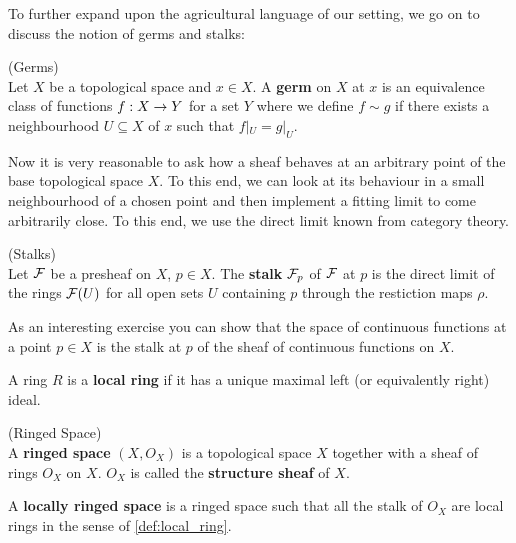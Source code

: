 To further expand upon the agricultural language of our setting, we go on to discuss the notion of germs and stalks:

\begin{definition} (Germs)\\
  Let $X$ be a topological space and $x \in X$. A \textbf{germ} on $X$ at $x$ is an equivalence class of functions $f:X \rightarrow Y$ for a set $Y$ where we define $f\sim g$ if there exists a neighbourhood $U\subseteq X$ of $x$ such that $f|_U = g|_U$.
\end{definition}

Now it is very reasonable to ask how a sheaf behaves at an arbitrary point of the base topological space $X$. To this end, we can look at its behaviour in a small neighbourhood of a chosen point and then implement a fitting limit to come arbitrarily close. To this end, we use the direct limit known from category theory.

\begin{definition} (Stalks)\\
  Let ${\mathcal{F}}$ be a presheaf on $X$, $p \in X$. The \textbf{stalk} ${\mathcal{F}}_p$ of ${\mathcal{F}}$ at $p$ is the direct limit of the rings ${\mathcal{F}}(U)$ for all open sets $U$ containing $p$ through the restiction maps $\rho$.
\end{definition}


\begin{ex}
  As an interesting exercise you can show that the space of continuous functions at a point $p \in X$ is the stalk at $p$ of the sheaf of continuous functions on $X$.
\end{ex}

\begin{definition}
\label{def:local_ring}
  A ring $R$ is a \textbf{local ring} if it has a unique maximal left (or equivalently right) ideal.
\end{definition}

\begin{definition} (Ringed Space)\\
  A \textbf{ringed space} $(X, O_X)$ is a topological space $X$ together with a sheaf of rings $O_X$ on $X$. $O_X$ is called the \textbf{structure sheaf} of $X$.
\end{definition}

\begin{definition}
  A \textbf{locally ringed space} is a ringed space such that all the stalk of $O_X$ are local rings in the sense of \ref{def:local_ring}.
\end{definition}

